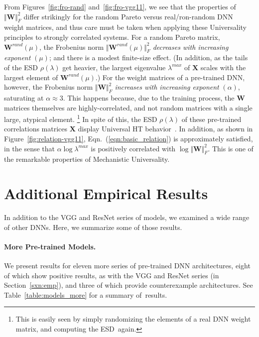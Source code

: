 {From Figures~\ref{fig:fro-rand} and~\ref{fig:fro-vgg11}, we see that the properties of $\Vert\mathbf{W}\Vert^{2}_{F}$ differ strikingly for the random Pareto versus real/ron-random DNN weight matrices, and thus care must be taken when applying these Universality principles to strongly correlated systems.
For a random Pareto matrix, $\mathbf{W}^{rand}(\mu)$, the Frobenius norm $\Vert\mathbf{W}^{rand}(\mu)\Vert^{2}_{F}$ \emph{decreases with increasing exponent} $(\mu)$; and there is a modest finite-size effect.
(In addition, as the tails of the ESD $\rho(\lambda)$ get heavier, the largest eigenvalue $\lambda^{max}$ of $\mathbf{X}$ scales with the largest element of $\mathbf{W}^{rand}(\mu)$.) 
For the weight matrices of a pre-trained DNN, however, the Frobenius norm $\Vert\mathbf{W}\Vert^{2}_{F}$ \emph{increases with increasing exponent} $(\alpha)$, saturating at $\alpha\approx 3$.
This happens because, due to the training process, the $\mathbf{W}$ matrices themselves are highly-correlated, and not random matrices with a single large, atypical element.%
\footnote{This is easily seen by simply randomizing the elements of a real DNN weight matrix, and computing the ESD~again.}
In spite of this, the ESD $\rho(\lambda)$ of these pre-trained correlations matrices $\mathbf{X}$ display Universal HT behavior~\cite{MM18_TR,MM19_HTSR_ICML}.
In addition, as shown in Figure~\ref{fig:relation-vgg11}, Eqn.~(\ref{eqn:basic_relation}) is approximately satisfied, in the sense that $\alpha\log\lambda^{max}$ is positively correlated with $\log\Vert\mathbf{W}\Vert^{2}_{F} $.
This is one of the remarkable properties of Mechanistic Universality.


\section{Additional Empirical Results}
\label{sxn:appendix-addl-empirical}

In addition to the VGG and ResNet series of models, we examined a wide range of other DNNs.
Here, we summarize some of those results.

\paragraph{More Pre-trained Models.}

We present results for eleven more series of pre-trained DNN architectures, eight of which show positive results, as with the VGG and ResNet series (in Section~\ref{sxn:emp}), and three of which provide counterexample architectures.
See Table~\ref{table:models_more} for a summary of~results.

}
